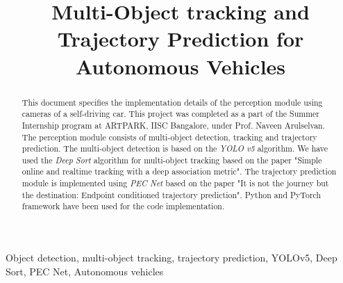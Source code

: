 \documentclass[conference]{IEEEtran}
\begin{document}
\title{Multi-Object tracking and Trajectory Prediction for Autonomous Vehicles\\
}

\author{
  \and
}

\maketitle

\begin{abstract}
  This document specifies the implementation details of the perception module using cameras of a self-driving car. This project was completed as a part of the Summer Internship program at ARTPARK, IISC Bangalore, under Prof. Naveen Arulselvan. The perception module consists of multi-object detection, tracking and trajectory prediction. The multi-object detection is based on the \textit{YOLO v5} algorithm. We have used the \textit{ Deep Sort} algorithm for multi-object tracking based on the paper "Simple online and realtime tracking with a deep association metric". The trajectory prediction module is implemented using \textit{PEC Net} based on the paper "It is not the journey but the destination: Endpoint conditioned trajectory prediction". Python and PyTorch framework have been used for the code implementation.
\end{abstract}

\begin{IEEEkeywords}
  Object detection, multi-object tracking, trajectory prediction, YOLOv5, Deep Sort, PEC Net, Autonomous vehicles
\end{IEEEkeywords}
\end{document}
